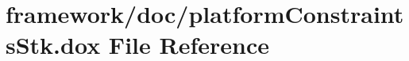 \hypertarget{platform_constraints_stk_8dox}{}\section{framework/doc/platform\+Constraints\+Stk.dox File Reference}
\label{platform_constraints_stk_8dox}
